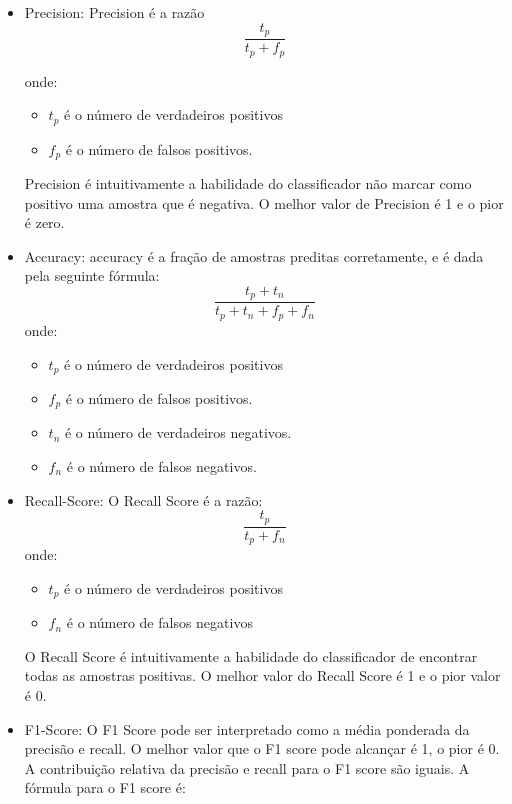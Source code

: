 \documentclass[conference]{IEEEtran}
\begin{document}
\begin{itemize}
\item Precision: Precision é a razão
    \begin{equation}
        \frac{t_p}{t_p + f_p}
    \end{equation}

    onde:

    \begin{itemize}
    \item $t_p$ é o número de verdadeiros positivos
    \item $f_p$ é o número de falsos positivos.
    \end{itemize}

    Precision é intuitivamente a habilidade do classificador não marcar como positivo uma amostra que é negativa. O melhor valor de Precision é 1 e o pior é zero.
    \cite{b7}
\item Accuracy: accuracy é a fração de amostras preditas corretamente, e é dada pela seguinte fórmula:
\begin{equation}
    \frac{t_p + t_n}{t_p + t_n + f_p + f_n}
\end{equation}
onde:
\begin{itemize}
    \item $t_p$ é o número de verdadeiros positivos
    \item $f_p$ é o número de falsos positivos.
    \item $t_n$ é o número de verdadeiros negativos.
    \item $f_n$ é o número de falsos negativos.
\end{itemize}
\cite{b8}
\item Recall-Score: O Recall Score é a razão:
    \begin{equation}
        \frac{t_p}{t_p + f_n}
    \end{equation}
    onde:
    \begin{itemize}
    \item $t_p$ é o número de verdadeiros positivos
    \item $f_n$ é o número de falsos negativos
    \end{itemize}
    O Recall Score é intuitivamente a habilidade do classificador de encontrar todas as amostras positivas. O melhor valor do Recall Score é 1 e o pior valor é 0.
    \cite{b6}
\item F1-Score: O F1 Score pode ser interpretado como a média ponderada da precisão e recall. O melhor valor que o  F1 score pode alcançar é 1, o pior é 0. A contribuição relativa da precisão e recall para o F1 score são iguais. A fórmula para o F1 score é:

\end{itemize}
\end{document}

